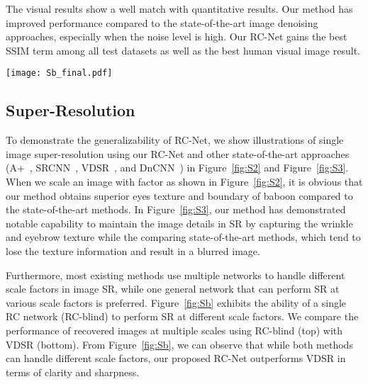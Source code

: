 \documentclass[10pt,twocolumn,letterpaper]{article}
\begin{document}
The visual results show a well match with quantitative results. Our method has improved performance compared to the state-of-the-art image denoising approaches, especially when the noise level is high. Our RC-Net gains the best SSIM term among all test datasets as well as the best human visual image result.




\begin{figure*}[!]
\centering
  \texttt{[image: Sb\_final.pdf]}
  \caption{Visual results of single network for multiple scale factors.  ROIs are selected and enlarged on the right. \textbf{Top}: Restoration results within RC-blind network, RC-blind is trained on scale factor = , , and .  \textbf{Bottom}: SR results generated by VDSR}
\label{fig:Sb}
\end{figure*}



\subsection{Super-Resolution}
To demonstrate the generalizability of RC-Net, we show illustrations of single image super-resolution using our RC-Net and other state-of-the-art approaches (A+~\cite{timofte2014a+}, SRCNN~\cite{dong2014learning}, VDSR~\cite{kim2016accurate}, and DnCNN~\cite{zhang2016beyond}) in Figure~\ref{fig:S2} and Figure~\ref{fig:S3}. When we scale an image with  factor as shown in Figure~\ref{fig:S2}, it is obvious that our method obtains superior eyes texture and boundary of baboon compared to the state-of-the-art methods. In Figure~\ref{fig:S3}, our method has demonstrated notable capability to maintain the image details in SR by capturing the wrinkle and eyebrow texture while the comparing state-of-the-art methods, which tend to lose the texture information and result in a blurred image. 

Furthermore, most existing methods use multiple networks to handle different scale factors in image SR, while one general network that can perform SR at various scale factors is preferred. Figure~\ref{fig:Sb} exhibits the ability of a single RC network (RC-blind) to perform SR at different scale factors. We compare the performance of recovered images at multiple scales using RC-blind (top) with VDSR (bottom). From Figure~\ref{fig:Sb}, we can observe that while both methods can handle different scale factors, our proposed RC-Net outperforms VDSR in terms of clarity and sharpness.
\end{document}
